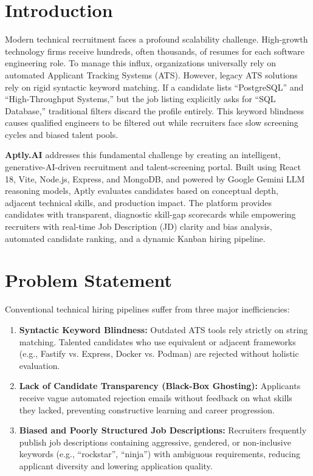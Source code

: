 \documentclass[12pt, a4paper]{article}
\begin{document}
\vspace{0.2cm}

\section{Introduction}
Modern technical recruitment faces a profound scalability challenge. High-growth technology firms receive hundreds, often thousands, of resumes for each software engineering role. To manage this influx, organizations universally rely on automated Applicant Tracking Systems (ATS). However, legacy ATS solutions rely on rigid syntactic keyword matching. If a candidate lists ``PostgreSQL'' and ``High-Throughput Systems,'' but the job listing explicitly asks for ``SQL Database,'' traditional filters discard the profile entirely. This keyword blindness causes qualified engineers to be filtered out while recruiters face slow screening cycles and biased talent pools.

\textbf{Aptly.AI} addresses this fundamental challenge by creating an intelligent, generative-AI-driven recruitment and talent-screening portal. Built using React 18, Vite, Node.js, Express, and MongoDB, and powered by Google Gemini LLM reasoning models, Aptly evaluates candidates based on conceptual depth, adjacent technical skills, and production impact. The platform provides candidates with transparent, diagnostic skill-gap scorecards while empowering recruiters with real-time Job Description (JD) clarity and bias analysis, automated candidate ranking, and a dynamic Kanban hiring pipeline.

\section{Problem Statement}
Conventional technical hiring pipelines suffer from three major inefficiencies:
\begin{enumerate}[label=\textbf{\arabic*.}]
    \item \textbf{Syntactic Keyword Blindness:} Outdated ATS tools rely strictly on string matching. Talented candidates who use equivalent or adjacent frameworks (e.g., Fastify vs. Express, Docker vs. Podman) are rejected without holistic evaluation.
    \item \textbf{Lack of Candidate Transparency (Black-Box Ghosting):} Applicants receive vague automated rejection emails without feedback on what skills they lacked, preventing constructive learning and career progression.
    \item \textbf{Biased and Poorly Structured Job Descriptions:} Recruiters frequently publish job descriptions containing aggressive, gendered, or non-inclusive keywords (e.g., ``rockstar'', ``ninja'') with ambiguous requirements, reducing applicant diversity and lowering application quality.
\end{enumerate}
\end{document}
